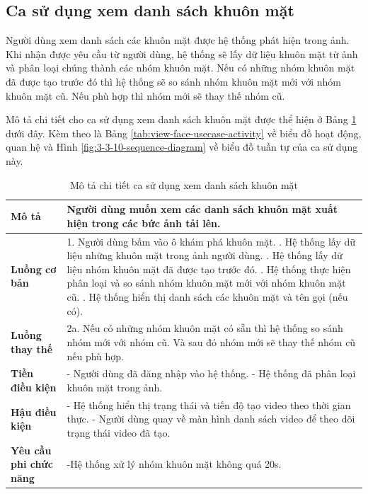 \subsection{Ca sử dụng xem danh sách khuôn mặt}

Người dùng xem danh sách các khuôn mặt được hệ thống phát hiện trong ảnh. Khi nhận được yêu cầu từ người dùng, hệ thống sẽ lấy dữ liệu khuôn mặt từ ảnh và phân loại chúng thành các nhóm khuôn mặt. Nếu có những nhóm khuôn mặt đã được tạo trước đó thì hệ thống sẽ so sánh nhóm khuôn mặt mới với nhóm khuôn mặt cũ. Nếu phù hợp thì nhóm mới sẽ thay thế nhóm cũ.  

Mô tả chi tiết cho ca sử dụng xem danh sách khuôn mặt được thể hiện ở Bảng \ref{tab:view-face-usecase} dưới đây. Kèm theo là Bảng \ref{tab:view-face-usecase-activity} về biểu đồ hoạt động, quan hệ và Hình \ref{fig:3-3-10-sequence-diagram} về biểu đồ tuần tự của ca sử dụng này. 

\noindent 
\begin{table}[H]
\centering
\caption{Mô tả chi tiết ca sử dụng xem danh sách khuôn mặt}
\label{tab:view-face-usecase}
\begin{tabularx}{\linewidth}{| l | X |} 
\hline 
\textbf{Mô tả} & Người dùng muốn xem các danh sách khuôn mặt xuất hiện trong các bức ảnh tải lên. \\
\hline 
\textbf{Luồng cơ bản} & 1. Người dùng bấm vào ô khám phá khuôn mặt. \newline
                       2. Hệ thống lấy dữ liệu những khuôn mặt trong ảnh người dùng. \newline
                       3. Hệ thống lấy dữ liệu nhóm khuôn mặt đã được tạo trước đó. \newline
                       4. Hệ thống thực hiện phân loại và so sánh nhóm khuôn mặt mới với nhóm khuôn mặt cũ. \newline
                       5. Hệ thống hiển thị danh sách các khuôn mặt và tên gọi (nếu có). \\
\hline
\textbf{Luồng thay thế} & 2a. Nếu có những nhóm khuôn mặt có sẵn thì hệ thống so sánh nhóm mới với nhóm cũ. Và sau đó nhóm mới sẽ thay thế nhóm cũ nếu phù hợp. \\
\hline
\textbf{Tiền điều kiện} & - Người dùng đã đăng nhập vào hệ thống. \newline
                           - Hệ thống đã phân loại khuôn mặt trong ảnh. \\
\hline
\textbf{Hậu điều kiện} & - Hệ thống hiển thị trạng thái và tiến độ tạo video theo thời gian thực. \newline
                         - Người dùng quay về màn hình danh sách video để theo dõi trạng thái video đã tạo. \\
\hline 
\textbf{Yêu cầu phi chức năng} & -Hệ thống xử lý nhóm khuôn mặt không quá 20s. \\
\hline 
\end{tabularx}
\end{table}


